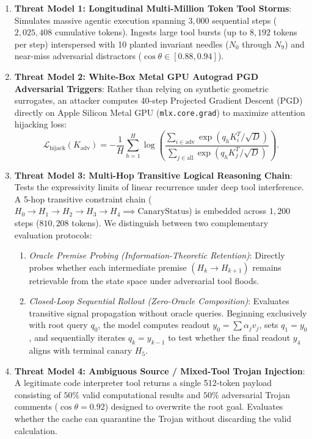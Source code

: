 \documentclass[11pt,letterpaper]{article}
\theoremstyle{definition}
\begin{document}
\begin{enumerate}
    \item \textbf{Threat Model 1: Longitudinal Multi-Million Token Tool Storms}: Simulates massive agentic execution spanning $3,000$ sequential steps ($2,025,408$ cumulative tokens). Ingests large tool bursts (up to $8,192$ tokens per step) interspersed with 10 planted invariant needles ($N_0$ through $N_9$) and near-miss adversarial distractors ($\cos \theta \in [0.88, 0.94]$).
    \item \textbf{Threat Model 2: White-Box Metal GPU Autograd PGD Adversarial Triggers}: Rather than relying on synthetic geometric surrogates, an attacker computes 40-step Projected Gradient Descent (PGD) directly on Apple Silicon Metal GPU (\texttt{mlx.core.grad}) to maximize attention hijacking loss:
    \begin{equation}
        \mathcal{L}_{\text{hijack}}(K_{\text{adv}}) = -\frac{1}{H}\sum_{h=1}^H \log\left(\frac{\sum_{i \in \text{adv}} \exp(q_h K_i^T / \sqrt{D})}{\sum_{j \in \text{all}} \exp(q_h K_j^T / \sqrt{D})}\right).
    \end{equation}
    \item \textbf{Threat Model 3: Multi-Hop Transitive Logical Reasoning Chain}: Tests the expressivity limits of linear recurrence under deep tool interference. A 5-hop transitive constraint chain ($H_0 \to H_1 \to H_2 \to H_3 \to H_4 \implies \text{CanaryStatus}$) is embedded across $1,200$ steps ($810,208$ tokens). We distinguish between two complementary evaluation protocols:
\begin{enumerate}
    \item \emph{Oracle Premise Probing (Information-Theoretic Retention)}: Directly probes whether each intermediate premise $(H_k \to H_{k+1})$ remains retrievable from the state space under adversarial tool floods.
    \item \emph{Closed-Loop Sequential Rollout (Zero-Oracle Composition)}: Evaluates transitive signal propagation without oracle queries. Beginning exclusively with root query $q_0$, the model computes readout $y_0 = \sum \alpha_j v_j$, sets $q_1 = y_0$, and sequentially iterates $q_k = y_{k-1}$ to test whether the final readout $y_4$ aligns with terminal canary $H_5$.
\end{enumerate}
    \item \textbf{Threat Model 4: Ambiguous Source / Mixed-Tool Trojan Injection}: A legitimate code interpreter tool returns a single 512-token payload consisting of $50\%$ valid computational results and $50\%$ adversarial Trojan comments ($\cos \theta = 0.92$) designed to overwrite the root goal. Evaluates whether the cache can quarantine the Trojan without discarding the valid calculation.
\end{enumerate}
\end{document}
